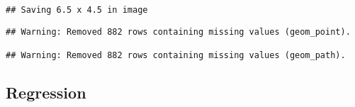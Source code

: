 \documentclass[]{article}
\begin{document}
\begin{verbatim}
## Saving 6.5 x 4.5 in image
\end{verbatim}

\begin{verbatim}
## Warning: Removed 882 rows containing missing values (geom_point).

## Warning: Removed 882 rows containing missing values (geom_path).
\end{verbatim}

\hypertarget{regression}{%
\subsection{Regression}\label{regression}}
\end{document}
